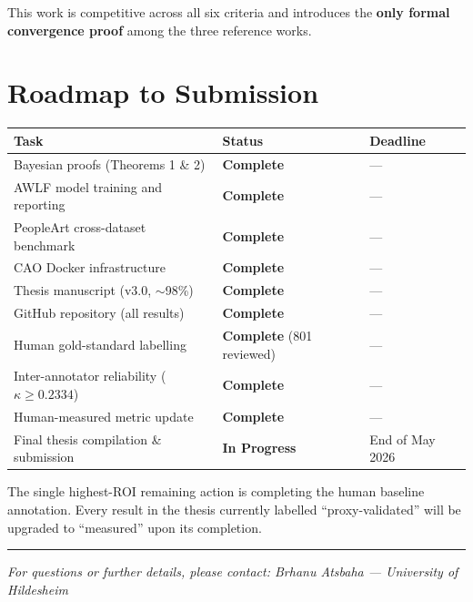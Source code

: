 \documentclass[11pt,a4paper]{article}
\theoremstyle{plain}
\begin{document}
This work is competitive across all six criteria and introduces the \textbf{only formal convergence proof} among the three reference works.

\section{Roadmap to Submission}

\begin{table}[h]
\centering
\renewcommand{\arraystretch}{1.3}
\begin{tabular}{lll}
\toprule
\textbf{Task} & \textbf{Status} & \textbf{Deadline} \\
\midrule
Bayesian proofs (Theorems 1 \& 2) & \textcolor{accentgreen}{\textbf{Complete}} & — \\
AWLF model training and reporting & \textcolor{accentgreen}{\textbf{Complete}} & — \\
PeopleArt cross-dataset benchmark & \textcolor{accentgreen}{\textbf{Complete}} & — \\
CAO Docker infrastructure & \textcolor{accentgreen}{\textbf{Complete}} & — \\
Thesis manuscript (v3.0, $\sim$98\%) & \textcolor{accentgreen}{\textbf{Complete}} & — \\
GitHub repository (all results) & \textcolor{accentgreen}{\textbf{Complete}} & — \\
Human gold-standard labelling & \textcolor{accentgreen}{\textbf{Complete}} (801 reviewed) & — \\
Inter-annotator reliability ($\kappa \geq 0.2334$) & \textcolor{accentgreen}{\textbf{Complete}} & — \\
Human-measured metric update & \textcolor{accentgreen}{\textbf{Complete}} & — \\
Final thesis compilation \& submission & \textbf{In Progress} & End of May 2026 \\
\bottomrule
\end{tabular}
\end{table}

The single highest-ROI remaining action is completing the human baseline annotation. Every result in the thesis currently labelled ``proxy-validated'' will be upgraded to ``measured'' upon its completion.

\vspace{12pt}
\noindent\rule{\linewidth}{0.4pt}
\vspace{4pt}
\begin{center}
\small\textit{For questions or further details, please contact: Brhanu Atsbaha — University of Hildesheim}
\end{center}
\end{document}
